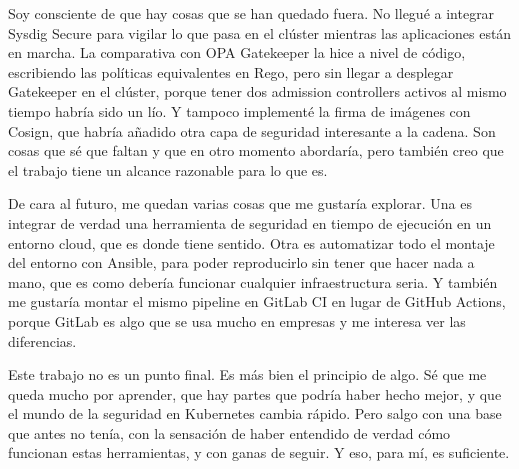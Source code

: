 Soy consciente de que hay cosas que se han quedado fuera. No llegué a integrar Sysdig Secure para vigilar lo que pasa en el clúster mientras las aplicaciones están en marcha. La comparativa con OPA Gatekeeper la hice a nivel de código, escribiendo las políticas equivalentes en Rego, pero sin llegar a desplegar Gatekeeper en el clúster, porque tener dos admission controllers activos al mismo tiempo habría sido un lío. Y tampoco implementé la firma de imágenes con Cosign, que habría añadido otra capa de seguridad interesante a la cadena. Son cosas que sé que faltan y que en otro momento abordaría, pero también creo que el trabajo tiene un alcance razonable para lo que es.

De cara al futuro, me quedan varias cosas que me gustaría explorar. Una es integrar de verdad una herramienta de seguridad en tiempo de ejecución en un entorno cloud, que es donde tiene sentido. Otra es automatizar todo el montaje del entorno con Ansible, para poder reproducirlo sin tener que hacer nada a mano, que es como debería funcionar cualquier infraestructura seria. Y también me gustaría montar el mismo pipeline en GitLab CI en lugar de GitHub Actions, porque GitLab es algo que se usa mucho en empresas y me interesa ver las diferencias.

Este trabajo no es un punto final. Es más bien el principio de algo. Sé que me queda mucho por aprender, que hay partes que podría haber hecho mejor, y que el mundo de la seguridad en Kubernetes cambia rápido. Pero salgo con una base que antes no tenía, con la sensación de haber entendido de verdad cómo funcionan estas herramientas, y con ganas de seguir. Y eso, para mí, es suficiente.
